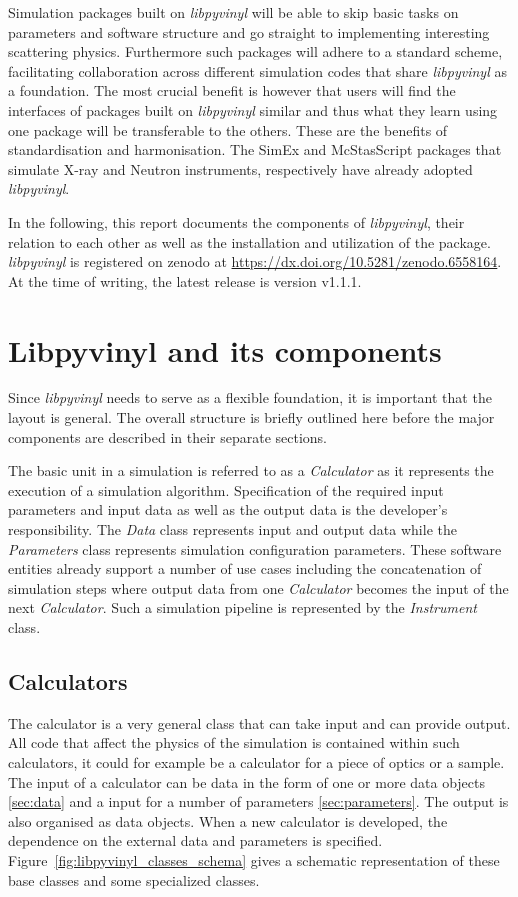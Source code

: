\documentclass[10pt]{scrartcl}
\begin{document}
Simulation packages built on \textit{libpyvinyl} will be
able to skip basic tasks on parameters and software structure and go straight
to implementing interesting scattering physics. Furthermore such packages
will adhere to a standard scheme, facilitating collaboration across
different simulation codes that share \textit{libpyvinyl} as a foundation.
The most crucial benefit is
however that users will find the interfaces of packages built on
\textit{libpyvinyl} similar and thus what they learn using one package will be
transferable to the others. These are the benefits of standardisation and
harmonisation. The SimEx and McStasScript packages that simulate X-ray and
Neutron instruments, respectively have  already adopted \textit{libpyvinyl}.

In the following, this report documents the components of \textit{libpyvinyl}, their
relation to each other as well as the installation and utilization of the
package. \textit{libpyvinyl} is registered on zenodo at \url{https://dx.doi.org/10.5281/zenodo.6558164}. At the time of writing, the latest release is version v1.1.1. 

\section{Libpyvinyl and its components}
\label{sec:libpyvinyl}
Since \textit{libpyvinyl} needs to serve as a flexible foundation, it is
important that the layout is general. The overall structure is briefly outlined
here before the major components are described in their separate sections.

The basic unit in a simulation is referred to as a \textit{Calculator} as it
represents the execution of a simulation algorithm.
Specification of the required input parameters and input data as well as the
output data is the developer's responsibility. The \textit{Data} class
represents input and output data while the \textit{Parameters} class represents
simulation configuration parameters. These software entities already support a
number of use cases including the concatenation of simulation steps where output
data from one \textit{Calculator} becomes the input of the next
\textit{Calculator}.
Such a simulation pipeline is represented by the \textit{Instrument} class.

\subsection{Calculators}
\label{sec:calculators}
The calculator is a very general class that can take input and can provide
output. All code that affect the physics of the simulation is contained within
such calculators, it could for example be a calculator for a piece of optics or
a sample. The input of a calculator can be data in the form of one or more data
objects \ref{sec:data} and a input for a number of parameters
\ref{sec:parameters}. The output is also organised as data objects. When a new
calculator is developed, the dependence on the external data and parameters is
specified. Figure~\ref{fig:libpyvinyl_classes_schema} gives a schematic
representation of these base classes and some specialized classes. 
\end{document}
